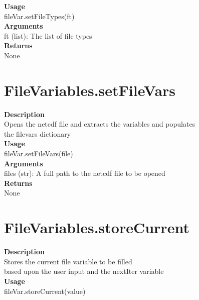 \documentclass[11pt, oneside]{article}
\begin{document}
\noindent\textbf{Usage} \\
        fileVar.setFileTypes(ft) \\

\noindent\textbf{Arguments} \\
        ft (list): The list of file types\\

\noindent\textbf{Returns} \\
        None\\


\section{FileVariables.setFileVars}

\textbf{Description} \\
        Opens the netcdf file and extracts the variables and populates\\
        the filevars dictionary\\

\noindent\textbf{Usage} \\
        fileVar.setFileVars(file) \\

\noindent\textbf{Arguments} \\
        files (str): A full path to the netcdf file to be opened\\

\noindent\textbf{Returns} \\
        None\\


\section{FileVariables.storeCurrent}

\textbf{Description} \\
        Stores the current file variable to be filled \\
        based upon the user input and the nextIter variable\\

\noindent\textbf{Usage} \\
        fileVar.storeCurrent(value) \\
\end{document}
